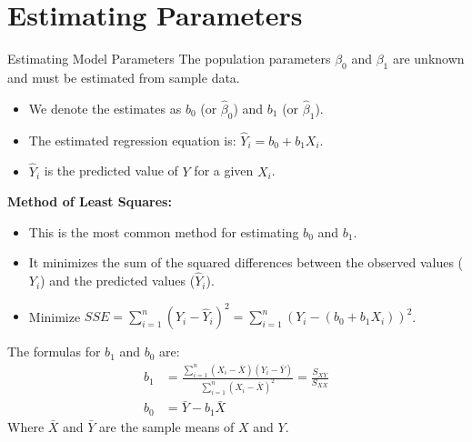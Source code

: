 \documentclass[aspectratio=169]{beamer}
\begin{document}
\section{Estimating Parameters}
\begin{frame}{Estimating Model Parameters}
  The population parameters $\beta_0$ and $\beta_1$ are unknown and must be estimated from sample data.
  \begin{itemize}
    \item We denote the estimates as $b_0$ (or $\hat{\beta}_0$) and $b_1$ (or $\hat{\beta}_1$).
    \item The estimated regression equation is: $\hat{Y}_i = b_0 + b_1 X_i$.
    \item $\hat{Y}_i$ is the predicted value of $Y$ for a given $X_i$.
  \end{itemize}
  \textbf{Method of Least Squares:}
  \begin{itemize}
    \item This is the most common method for estimating $b_0$ and $b_1$.
    \item It minimizes the sum of the squared differences between the observed values ($Y_i$) and the predicted values ($\hat{Y}_i$).
    \item Minimize $SSE = \sum_{i=1}^{n} (Y_i - \hat{Y}_i)^2 = \sum_{i=1}^{n} (Y_i - (b_0 + b_1 X_i))^2$.
  \end{itemize}
  The formulas for $b_1$ and $b_0$ are:
  \begin{align*}
    b_1 &= \frac{\sum_{i=1}^{n} (X_i - \bar{X})(Y_i - \bar{Y})}{\sum_{i=1}^{n} (X_i - \bar{X})^2} = \frac{S_{XY}}{S_{XX}} \\
    b_0 &= \bar{Y} - b_1 \bar{X}
  \end{align*}
  Where $\bar{X}$ and $\bar{Y}$ are the sample means of $X$ and $Y$.
\end{frame}
\end{document}
